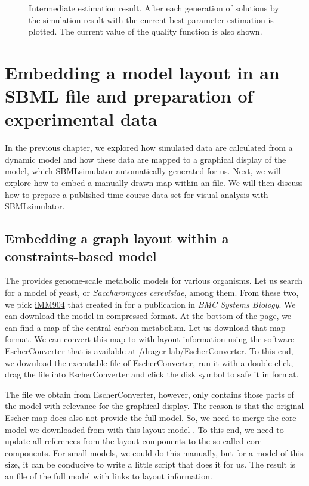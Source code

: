 \begin{figure}[h]
\centering
{}
\caption[Intermediate estimation result]{Intermediate estimation result.
After each generation of solutions by \EvA the simulation result with the current best parameter estimation is plotted.
The current value of the quality function is also shown.
}
\label{fig:estimationResult}
\end{figure}


\chapter{Embedding a model layout in an SBML file and preparation of experimental data}

In the previous chapter, we explored how simulated data are calculated from a dynamic model and how these data are mapped to a graphical display of the model, which SBMLsimulator automatically generated for us.
Next, we will explore how to embed a manually drawn map within an \SBML file.
We will then discuss how to prepare a published time-course data set for visual analysis with SBMLsimulator.

\section{Embedding a graph layout within a constraints-based model}

The \BiGG provides genome-scale metabolic models for various organisms.
Let us search for a model of yeast, or \emph{Saccharomyces cerevisiae}, among them.
From these two, we pick \href{https://identifiers.org/bigg.model/iMM904}{iMM904} that \citeauthor{Mo2009} created in \citeyear{Mo2009} for a publication in \emph{BMC Systems Biology}.
We can download the model in compressed \SBML format.
At the bottom of the page, we can find a map of the central carbon metabolism.
Let us download that map \JSON format.
We can convert this map to \SBML with layout information using the software EscherConverter \citep{King2015a} that is available at \href{https://github.com/drager-lab/EscherConverter}{\faGithub/drager-lab/EscherConverter}.
To this end, we download the executable \JAR file of EscherConverter, run it with a double click, drag the \JSON file into EscherConverter and click the disk symbol to safe it in \SBML format.

The \SBML file we obtain from EscherConverter, however, only contains those parts of the model with relevance for the graphical display.
The reason is that the original Escher map does also not provide the full model.
So, we need to merge the core model we downloaded from \BiGG with this \SBML layout model \citep{Gauges2015}.
To this end, we need to update all references from the layout components to the so-called \SBML core components.
For small models, we could do this manually, but for a model of this size, it can be conducive to write a little script that does it for us.
The result is an \SBML file of the full model with links to layout information.

